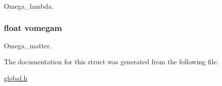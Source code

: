 Omega\+\_\+lambda. 

\hypertarget{struct_g_l_o_b_a_l_v_a_r_s_a305e8a7c8d8651e668ee02b94e6e82d2}{
\subsubsection[{vomegam}]{\setlength{\rightskip}{0pt plus 5cm}float vomegam}}\label{struct_g_l_o_b_a_l_v_a_r_s_a305e8a7c8d8651e668ee02b94e6e82d2}


Omega\+\_\+matter. 



The documentation for this struct was generated from the following file\+:\begin{DoxyCompactItemize}
\item 
\hyperlink{global_8h}{global.\+h}\end{DoxyCompactItemize}
